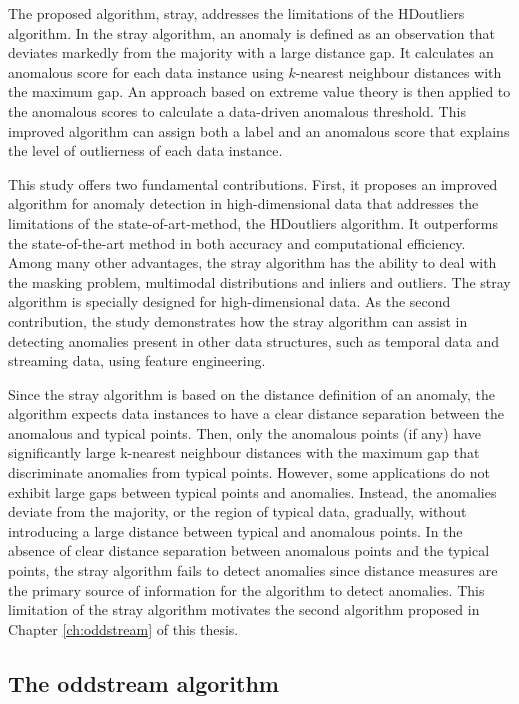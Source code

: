 \documentclass{monashthesis}
\theoremstyle{definition}
\theoremstyle{definition}
\theoremstyle{definition}
\theoremstyle{remark}
\begin{document}
The proposed algorithm, stray, addresses the limitations of the HDoutliers algorithm. In the stray algorithm, an anomaly is defined as an observation that deviates markedly from the majority with a large distance gap. It calculates an anomalous score for each data instance using \(k\)-nearest neighbour distances with the maximum gap. An approach based on extreme value theory is then applied to the anomalous scores to calculate a data-driven anomalous threshold. This improved algorithm can assign both a label and an anomalous score that explains the level of outlierness of each data instance.

This study offers two fundamental contributions. First, it proposes an improved algorithm for anomaly detection in high-dimensional data that addresses the limitations of the state-of-art-method, the HDoutliers algorithm. It outperforms the state-of-the-art method in both accuracy and computational efficiency. Among many other advantages, the stray algorithm has the ability to deal with the masking problem, multimodal distributions and inliers and outliers. The stray algorithm is specially designed for high-dimensional data. As the second contribution, the study demonstrates how the stray algorithm can assist in detecting anomalies present in other data structures, such as temporal data and streaming data, using feature engineering.

Since the stray algorithm is based on the distance definition of an anomaly, the algorithm expects data instances to have a clear distance separation between the anomalous and typical points. Then, only the anomalous points (if any) have significantly large k-nearest neighbour distances with the maximum gap that discriminate anomalies from typical points. However, some applications do not exhibit large gaps between typical points and anomalies. Instead, the anomalies deviate from the majority, or the region of typical data, gradually, without introducing a large distance between typical and anomalous points. In the absence of clear distance separation between anomalous points and the typical points, the stray algorithm fails to detect anomalies since distance measures are the primary source of information for the algorithm to detect anomalies. This limitation of the stray algorithm motivates the second algorithm proposed in Chapter \ref{ch:oddstream} of this thesis.

\hypertarget{the-oddstream-algorithm}{%
\subsection{The oddstream algorithm}\label{the-oddstream-algorithm}}
\end{document}
